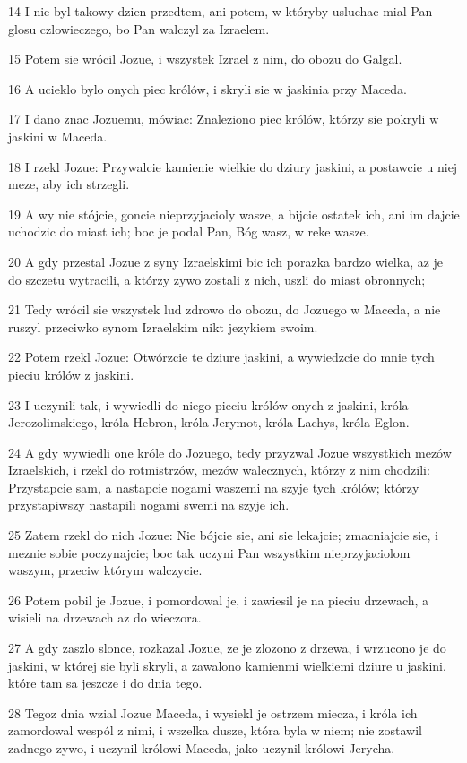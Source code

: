 \par 14 I nie byl takowy dzien przedtem, ani potem, w któryby usluchac mial Pan glosu czlowieczego, bo Pan walczyl za Izraelem.
\par 15 Potem sie wrócil Jozue, i wszystek Izrael z nim, do obozu do Galgal.
\par 16 A ucieklo bylo onych piec królów, i skryli sie w jaskinia przy Maceda.
\par 17 I dano znac Jozuemu, mówiac: Znaleziono piec królów, którzy sie pokryli w jaskini w Maceda.
\par 18 I rzekl Jozue: Przywalcie kamienie wielkie do dziury jaskini, a postawcie u niej meze, aby ich strzegli.
\par 19 A wy nie stójcie, goncie nieprzyjacioly wasze, a bijcie ostatek ich, ani im dajcie uchodzic do miast ich; boc je podal Pan, Bóg wasz, w reke wasze.
\par 20 A gdy przestal Jozue z syny Izraelskimi bic ich porazka bardzo wielka, az je do szczetu wytracili, a którzy zywo zostali z nich, uszli do miast obronnych;
\par 21 Tedy wrócil sie wszystek lud zdrowo do obozu, do Jozuego w Maceda, a nie ruszyl przeciwko synom Izraelskim nikt jezykiem swoim.
\par 22 Potem rzekl Jozue: Otwórzcie te dziure jaskini, a wywiedzcie do mnie tych pieciu królów z jaskini.
\par 23 I uczynili tak, i wywiedli do niego pieciu królów onych z jaskini, króla Jerozolimskiego, króla Hebron, króla Jerymot, króla Lachys, króla Eglon.
\par 24 A gdy wywiedli one króle do Jozuego, tedy przyzwal Jozue wszystkich mezów Izraelskich, i rzekl do rotmistrzów, mezów walecznych, którzy z nim chodzili: Przystapcie sam, a nastapcie nogami waszemi na szyje tych królów; którzy przystapiwszy nastapili nogami swemi na szyje ich.
\par 25 Zatem rzekl do nich Jozue: Nie bójcie sie, ani sie lekajcie; zmacniajcie sie, i meznie sobie poczynajcie; boc tak uczyni Pan wszystkim nieprzyjaciolom waszym, przeciw którym walczycie.
\par 26 Potem pobil je Jozue, i pomordowal je, i zawiesil je na pieciu drzewach, a wisieli na drzewach az do wieczora.
\par 27 A gdy zaszlo slonce, rozkazal Jozue, ze je zlozono z drzewa, i wrzucono je do jaskini, w której sie byli skryli, a zawalono kamienmi wielkiemi dziure u jaskini, które tam sa jeszcze i do dnia tego.
\par 28 Tegoz dnia wzial Jozue Maceda, i wysiekl je ostrzem miecza, i króla ich zamordowal wespól z nimi, i wszelka dusze, która byla w niem; nie zostawil zadnego zywo, i uczynil królowi Maceda, jako uczynil królowi Jerycha.
